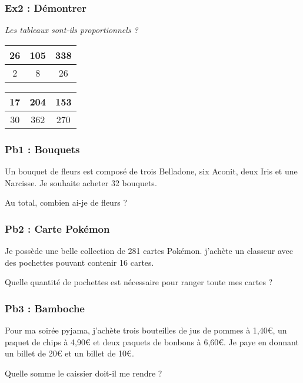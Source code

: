\subsubsection*{Ex2 : Démontrer} 

\textit{Les tableaux sont-ils proportionnels ?} 

\begin{multicols}{2}\noindent
  \begin{center}\begin{tabular}{|c|c|c|} \hline
    26 & 105 & 338 \\  \hline
    2 & 8 & 26\\  \hline
  \end{tabular}\end{center}
  \Pointilles[8]\columnbreak 

  \begin{center}\begin{tabular}{|c|c|c|} \hline
    17 & 204 & 153 \\  \hline
    30 & 362 & 270\\  \hline
  \end{tabular}\end{center}
    \Pointilles[8]
\end{multicols}
\newpage

\subsubsection*{Pb1 : Bouquets} 

Un bouquet de fleurs est composé de trois Belladone, six Aconit, deux Iris et une Narcisse. Je souhaite acheter 32 bouquets.

Au total, combien ai-je de fleurs ?

\Pointilles[6] 


\subsubsection*{Pb2 : Carte Pokémon} 

Je possède une belle collection de 281 cartes Pokémon. j’achète un classeur avec des pochettes pouvant contenir 16 cartes.

Quelle quantité de pochettes est nécessaire pour ranger toute mes cartes ?

\Pointilles[7]


\subsubsection*{Pb3 : Bamboche} 

Pour ma soirée pyjama, j'achète trois bouteilles de jus de pommes à 1,40€, un paquet de chips à 4,90€ et deux paquets de bonbons à 6,60€. Je paye en donnant un billet de 20€ et un billet de 10€. 

Quelle somme le caissier doit-il me rendre ?

\Pointilles[7]


